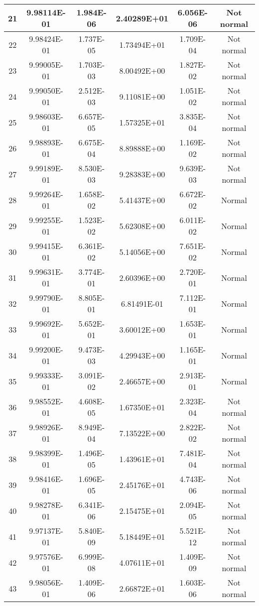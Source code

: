 \begin{table}[h]
\begin{tabular}{|c|c|c|c|c|c|}
		21 & 9.98114E-01 & 1.984E-06 & 2.40289E+01 & 6.056E-06 & Not normal\\\hline
		22 & 9.98424E-01 & 1.737E-05 & 1.73494E+01 & 1.709E-04 & Not normal\\\hline
		23 & 9.99005E-01 & 1.703E-03 & 8.00492E+00 & 1.827E-02 & Not normal\\\hline
		24 & 9.99050E-01 & 2.512E-03 & 9.11081E+00 & 1.051E-02 & Not normal\\\hline
		25 & 9.98603E-01 & 6.657E-05 & 1.57325E+01 & 3.835E-04 & Not normal\\\hline
		26 & 9.98893E-01 & 6.675E-04 & 8.89888E+00 & 1.169E-02 & Not normal\\\hline
		27 & 9.99189E-01 & 8.530E-03 & 9.28383E+00 & 9.639E-03 & Not normal\\\hline
		28 & 9.99264E-01 & 1.658E-02 & 5.41437E+00 & 6.672E-02 & Normal\\\hline
		29 & 9.99255E-01 & 1.523E-02 & 5.62308E+00 & 6.011E-02 & Normal\\\hline
		30 & 9.99415E-01 & 6.361E-02 & 5.14056E+00 & 7.651E-02 & Normal\\\hline
		31 & 9.99631E-01 & 3.774E-01 & 2.60396E+00 & 2.720E-01 & Normal\\\hline
		32 & 9.99790E-01 & 8.805E-01 & 6.81491E-01 & 7.112E-01 & Normal\\\hline
		33 & 9.99692E-01 & 5.652E-01 & 3.60012E+00 & 1.653E-01 & Normal\\\hline
		34 & 9.99200E-01 & 9.473E-03 & 4.29943E+00 & 1.165E-01 & Normal\\\hline
		35 & 9.99333E-01 & 3.091E-02 & 2.46657E+00 & 2.913E-01 & Normal\\\hline
		36 & 9.98552E-01 & 4.608E-05 & 1.67350E+01 & 2.323E-04 & Not normal\\\hline
		37 & 9.98926E-01 & 8.949E-04 & 7.13522E+00 & 2.822E-02 & Not normal\\\hline
		38 & 9.98399E-01 & 1.496E-05 & 1.43961E+01 & 7.481E-04 & Not normal\\\hline
		39 & 9.98416E-01 & 1.696E-05 & 2.45176E+01 & 4.743E-06 & Not normal\\\hline
		40 & 9.98278E-01 & 6.341E-06 & 2.15475E+01 & 2.094E-05 & Not normal\\\hline
		41 & 9.97137E-01 & 5.840E-09 & 5.18449E+01 & 5.521E-12 & Not normal\\\hline
		42 & 9.97576E-01 & 6.999E-08 & 4.07611E+01 & 1.409E-09 & Not normal\\\hline
		43 & 9.98056E-01 & 1.409E-06 & 2.66872E+01 & 1.603E-06 & Not normal\\\hline

\end{tabular}
\end{table}
